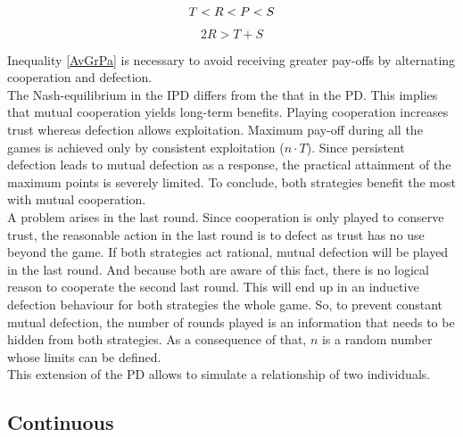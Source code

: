 \documentclass{article}
\begin{document}
\begin{equation}
T < R < P < S\\
\end{equation}
\begin{equation}\label{AvGrPa}
2R > T + S
\end{equation}

Inequality \eqref{AvGrPa} is necessary to avoid receiving greater pay-offs by alternating cooperation and defection.\\
The Nash-equilibrium in the IPD differs from the that in the PD.
This implies that mutual cooperation yields long-term benefits.
Playing cooperation increases trust whereas defection allows exploitation.
Maximum pay-off during all the games is achieved only by consistent exploitation ($n \cdot T$).
Since persistent defection leads to mutual defection as a response, the practical attainment of the maximum points is severely limited.
To conclude, both strategies benefit the most with mutual cooperation.\\
A problem arises in the last round.
Since cooperation is only played to conserve trust, the reasonable action in the last round is to defect as trust has no use beyond the game.
If both strategies act rational, mutual defection will be played in the last round.
And because both are aware of this fact, there is no logical reason to cooperate the second last round.
This will end up in an inductive defection behaviour for both strategies the whole game.
So, to prevent constant mutual defection, the number of rounds played is an information that needs to be hidden from both strategies.
As a consequence of that, $n$ is a random number whose limits can be defined.\\
This extension of the PD allows to simulate a relationship of two individuals.

\subsection{Continuous}
\end{document}
